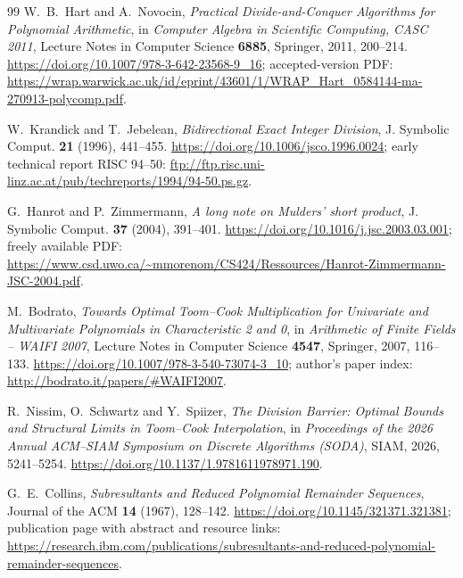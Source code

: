 \documentclass[11pt]{book}
\theoremstyle{definition}
\begin{document}
\begin{thebibliography}{99}
W.~B.~Hart and A.~Novocin,
\emph{Practical Divide-and-Conquer Algorithms for Polynomial Arithmetic},
in \emph{Computer Algebra in Scientific Computing, CASC 2011},
Lecture Notes in Computer Science \textbf{6885}, Springer, 2011, 200--214.
\newline
\url{https://doi.org/10.1007/978-3-642-23568-9_16};
accepted-version PDF:
\url{https://wrap.warwick.ac.uk/id/eprint/43601/1/WRAP_Hart_0584144-ma-270913-polycomp.pdf}.

W.~Krandick and T.~Jebelean,
\emph{Bidirectional Exact Integer Division},
J. Symbolic Comput. \textbf{21} (1996), 441--455.
\newline
\url{https://doi.org/10.1006/jsco.1996.0024};
early technical report RISC 94--50:
\url{ftp://ftp.risc.uni-linz.ac.at/pub/techreports/1994/94-50.ps.gz}.

G.~Hanrot and P.~Zimmermann,
\emph{A long note on Mulders' short product},
J. Symbolic Comput. \textbf{37} (2004), 391--401.
\newline
\url{https://doi.org/10.1016/j.jsc.2003.03.001};
freely available PDF:
\url{https://www.csd.uwo.ca/~mmorenom/CS424/Ressources/Hanrot-Zimmermann-JSC-2004.pdf}.

M.~Bodrato,
\emph{Towards Optimal Toom--Cook Multiplication for Univariate and
Multivariate Polynomials in Characteristic 2 and 0},
in \emph{Arithmetic of Finite Fields -- WAIFI 2007},
Lecture Notes in Computer Science \textbf{4547}, Springer, 2007, 116--133.
\newline
\url{https://doi.org/10.1007/978-3-540-73074-3_10};
author's paper index:
\url{http://bodrato.it/papers/#WAIFI2007}.


R.~Nissim, O.~Schwartz and Y.~Spiizer,
\emph{The Division Barrier: Optimal Bounds and Structural Limits in
Toom--Cook Interpolation},
in \emph{Proceedings of the 2026 Annual ACM--SIAM Symposium on Discrete
Algorithms (SODA)}, SIAM, 2026, 5241--5254.
\newline
\url{https://doi.org/10.1137/1.9781611978971.190}.

G.~E.~Collins,
\emph{Subresultants and Reduced Polynomial Remainder Sequences},
Journal of the ACM \textbf{14} (1967), 128--142.
\newline
\url{https://doi.org/10.1145/321371.321381};
publication page with abstract and resource links:
\url{https://research.ibm.com/publications/subresultants-and-reduced-polynomial-remainder-sequences}.


\end{thebibliography}
\end{document}
